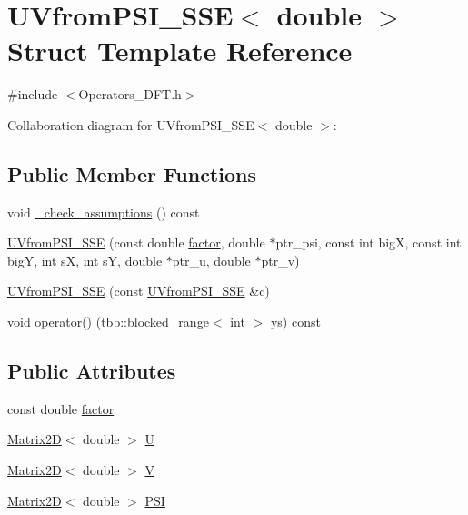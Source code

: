 \hypertarget{struct_u_vfrom_p_s_i___s_s_e_3_01double_01_4}{}\section{U\+Vfrom\+P\+S\+I\+\_\+\+S\+S\+E$<$ double $>$ Struct Template Reference}
\label{struct_u_vfrom_p_s_i___s_s_e_3_01double_01_4}


{\ttfamily \#include $<$Operators\+\_\+\+D\+F\+T.\+h$>$}



Collaboration diagram for U\+Vfrom\+P\+S\+I\+\_\+\+S\+S\+E$<$ double $>$\+:
\subsection*{Public Member Functions}
\begin{DoxyCompactItemize}
\item 
void \hyperlink{struct_u_vfrom_p_s_i___s_s_e_3_01double_01_4_a819a9b7f93d5acd5dfb2dceb4c4b64a9}{\+\_\+check\+\_\+assumptions} () const 
\item 
\hyperlink{struct_u_vfrom_p_s_i___s_s_e_3_01double_01_4_ab18d50ac5b80e1cbae7d31b2e4db5a63}{U\+Vfrom\+P\+S\+I\+\_\+\+S\+S\+E} (const double \hyperlink{struct_u_vfrom_p_s_i___s_s_e_3_01double_01_4_a13a8e60c24481a28b30a5bfff9de6d57}{factor}, double $\ast$ptr\+\_\+psi, const int big\+X, const int big\+Y, int s\+X, int s\+Y, double $\ast$ptr\+\_\+u, double $\ast$ptr\+\_\+v)
\item 
\hyperlink{struct_u_vfrom_p_s_i___s_s_e_3_01double_01_4_acb95bbecc1ef308681377af43761a365}{U\+Vfrom\+P\+S\+I\+\_\+\+S\+S\+E} (const \hyperlink{struct_u_vfrom_p_s_i___s_s_e}{U\+Vfrom\+P\+S\+I\+\_\+\+S\+S\+E} \&c)
\item 
void \hyperlink{struct_u_vfrom_p_s_i___s_s_e_3_01double_01_4_a2854bee9f48d0ecafb436f53e8dd17ae}{operator()} (tbb\+::blocked\+\_\+range$<$ int $>$ ys) const 
\end{DoxyCompactItemize}
\subsection*{Public Attributes}
\begin{DoxyCompactItemize}
\item 
const double \hyperlink{struct_u_vfrom_p_s_i___s_s_e_3_01double_01_4_a13a8e60c24481a28b30a5bfff9de6d57}{factor}
\item 
\hyperlink{class_matrix2_d}{Matrix2\+D}$<$ double $>$ \hyperlink{struct_u_vfrom_p_s_i___s_s_e_3_01double_01_4_a4dc3dc281fa328c5b353e97610b762d8}{U}
\item 
\hyperlink{class_matrix2_d}{Matrix2\+D}$<$ double $>$ \hyperlink{struct_u_vfrom_p_s_i___s_s_e_3_01double_01_4_a7e5177ab59f35582a6782b43106ec3d8}{V}
\item 
\hyperlink{class_matrix2_d}{Matrix2\+D}$<$ double $>$ \hyperlink{struct_u_vfrom_p_s_i___s_s_e_3_01double_01_4_a85a52a48e0761ffe50e94a48ec6c652e}{P\+S\+I}
\end{DoxyCompactItemize}
